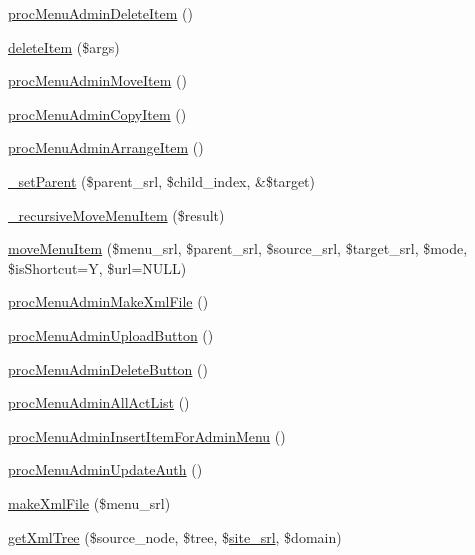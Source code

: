 \begin{DoxyCompactItemize}
\item 
\hyperlink{classmenuAdminController_a95f3b583f04dcd805696f7fd33b13d9c}{proc\+Menu\+Admin\+Delete\+Item} ()
\item 
\hyperlink{classmenuAdminController_a0a1051857eeec06de37b3d09729bd816}{delete\+Item} (\$args)
\item 
\hyperlink{classmenuAdminController_a4b1060e3cfddcffae2881a2981660b8b}{proc\+Menu\+Admin\+Move\+Item} ()
\item 
\hyperlink{classmenuAdminController_a57e5d3ee6747a38fd87eae506238e17f}{proc\+Menu\+Admin\+Copy\+Item} ()
\item 
\hyperlink{classmenuAdminController_ac803e1a5fb5bf35e30f20d727afb89dd}{proc\+Menu\+Admin\+Arrange\+Item} ()
\item 
\hyperlink{classmenuAdminController_a0eee3e8dfe3a4f9af9bd76f4776951cb}{\+\_\+set\+Parent} (\$parent\+\_\+srl, \$child\+\_\+index, \&\$target)
\item 
\hyperlink{classmenuAdminController_a663ff3838dde914ecaa1cd2875ce6848}{\+\_\+recursive\+Move\+Menu\+Item} (\$result)
\item 
\hyperlink{classmenuAdminController_af8dacd19919e854dbe083b602ea0f183}{move\+Menu\+Item} (\$menu\+\_\+srl, \$parent\+\_\+srl, \$source\+\_\+srl, \$target\+\_\+srl, \$mode, \$is\+Shortcut=\textquotesingle{}Y\textquotesingle{}, \$url=N\+U\+L\+L)
\item 
\hyperlink{classmenuAdminController_a8808afabf9eee859aca4150fc5d23051}{proc\+Menu\+Admin\+Make\+Xml\+File} ()
\item 
\hyperlink{classmenuAdminController_aa5f219cd08b79ff43eef69c89e7a9fd5}{proc\+Menu\+Admin\+Upload\+Button} ()
\item 
\hyperlink{classmenuAdminController_a8af649b53b356cc3b359253acd2183a2}{proc\+Menu\+Admin\+Delete\+Button} ()
\item 
\hyperlink{classmenuAdminController_a9a08d8c529270973c2dab9d62846b3b9}{proc\+Menu\+Admin\+All\+Act\+List} ()
\item 
\hyperlink{classmenuAdminController_a788f347d7232e73062a39785960a4f14}{proc\+Menu\+Admin\+Insert\+Item\+For\+Admin\+Menu} ()
\item 
\hyperlink{classmenuAdminController_aa7ae548464c3919b04a2153b6f9f2459}{proc\+Menu\+Admin\+Update\+Auth} ()
\item 
\hyperlink{classmenuAdminController_a1635d4c0dc3ace9e475422f9280e615e}{make\+Xml\+File} (\$menu\+\_\+srl)
\item 
\hyperlink{classmenuAdminController_ae924a4c2ac50c955e01e9c234d93c767}{get\+Xml\+Tree} (\$source\+\_\+node, \$tree, \$\hyperlink{ko_8install_8php_a8b1406b4ad1048041558dce6bfe89004}{site\+\_\+srl}, \$domain)

\end{DoxyCompactItemize}
